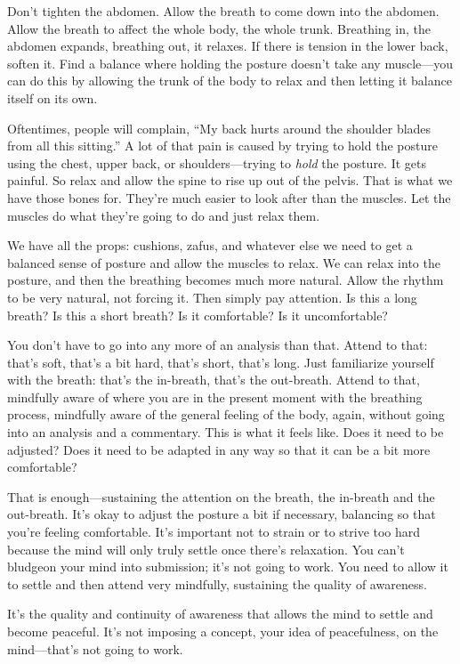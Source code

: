 Don’t tighten the abdomen. Allow the breath to come down into the
abdomen. Allow the breath to affect the whole body, the whole trunk.
Breathing in, the abdomen expands, breathing out, it relaxes. If there
is tension in the lower back, soften it. Find a balance where holding
the posture doesn’t take any muscle—you can do this by allowing the
trunk of the body to relax and then letting it balance itself on its
own.

Oftentimes, people will complain, “My back hurts around the shoulder
blades from all this sitting.” A lot of that pain is caused by trying to
hold the posture using the chest, upper back, or shoulders—trying to
\emph{hold} the posture. It gets painful. So relax and allow the spine
to rise up out of the pelvis. That is what we have those bones for.
They’re much easier to look after than the muscles. Let the muscles do
what they’re going to do and just relax them.

We have all the props: cushions, zafus, and whatever else we need to get
a balanced sense of posture and allow the muscles to relax. We can relax
into the posture, and then the breathing becomes much more natural.
Allow the rhythm to be very natural, not forcing it. Then simply pay
attention. Is this a long breath? Is this a short breath? Is it
comfortable? Is it uncomfortable?

You don’t have to go into any more of an analysis than that. Attend to
that: that’s soft, that’s a bit hard, that’s short, that’s long. Just
familiarize yourself with the breath: that’s the in-breath, that’s the
out-breath. Attend to that, mindfully aware of where you are in the
present moment with the breathing process, mindfully aware of the
general feeling of the body, again, without going into an analysis and a
commentary. This is what it feels like. Does it need to be adjusted?
Does it need to be adapted in any way so that it can be a bit more
comfortable?

That is enough—sustaining the attention on the breath, the in-breath and
the out-breath. It’s okay to adjust the posture a bit if necessary,
balancing so that you’re feeling comfortable. It’s important not to
strain or to strive too hard because the mind will only truly settle
once there’s relaxation. You can’t bludgeon your mind into submission;
it’s not going to work. You need to allow it to settle and then attend
very mindfully, sustaining the quality of awareness.

It’s the quality and continuity of awareness that allows the mind to
settle and become peaceful. It’s not imposing a concept, your idea of
peacefulness, on the mind—that’s not going to work.

